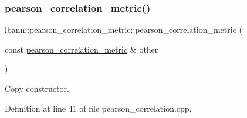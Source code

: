 \subsubsection{\texorpdfstring{pearson\+\_\+correlation\+\_\+metric()}{pearson\_correlation\_metric()}\hspace{0.1cm}{\footnotesize\ttfamily [2/2]}}
{\footnotesize\ttfamily lbann\+::pearson\+\_\+correlation\+\_\+metric\+::pearson\+\_\+correlation\+\_\+metric (\begin{DoxyParamCaption}\item[{const \hyperlink{classlbann_1_1pearson__correlation__metric}{pearson\+\_\+correlation\+\_\+metric} \&}]{other }\end{DoxyParamCaption})}

Copy constructor. 

Definition at line 41 of file pearson\+\_\+correlation.\+cpp.


